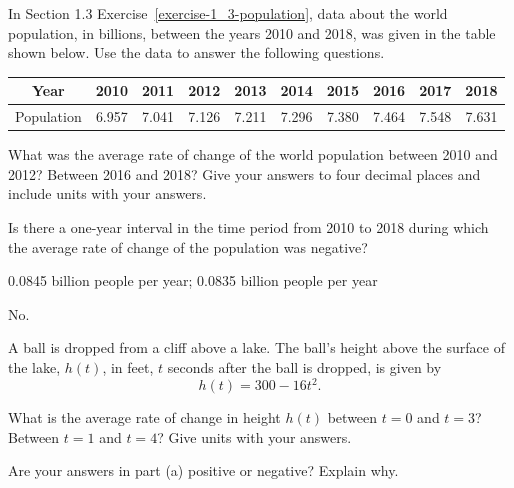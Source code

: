 \begin{exercise}
In Section 1.3 Exercise~\ref{exercise-1_3-population}, data about the world population, in billions, between the years 2010 and 2018, was given in the table shown below. Use the data to answer the following questions.

\begin{center}\footnotesize
\begin{tabular}{|c|c|c|c|c|c|c|c|c|c|}
\hline Year &2010 & 2011 & 2012 & 2013 & 2014 & 2015 & 2016 & 2017 & 2018
\\\hline Population & 6.957 & 7.041  & 7.126& 7.211  & 7.296 & 7.380 &7.464  & 7.548 & 7.631
\\\hline
\end{tabular}
\end{center}

    \begin{parts}
        \item What was the average rate of change of the world population between 2010 and 2012? Between 2016 and 2018? Give your answers to four decimal places and include units with your answers.

        \item Is there a one-year interval in the time period from 2010 to 2018 during which the average rate of change of the population was negative?
    \end{parts}
\end{exercise}



\begin{solution}
    \begin{parts}
        \item 0.0845 billion people per year; 0.0835 billion people per year
        \item No.
    \end{parts}
\end{solution}






\begin{exercise}
A ball is dropped from a cliff above a lake. The ball's height above the surface of the lake, $h(t)$, in feet, $t$ seconds after the ball is dropped, is given by
\[h(t)=300-16t^2.\]

    \begin{parts}
        \item What is the average rate of change in height $h(t)$ between $t=0$ and $t=3$? Between $t=1$ and $t=4$? Give units with your answers.

        \item Are your answers in part (a) positive or negative? Explain why.
    \end{parts}
\end{exercise}




